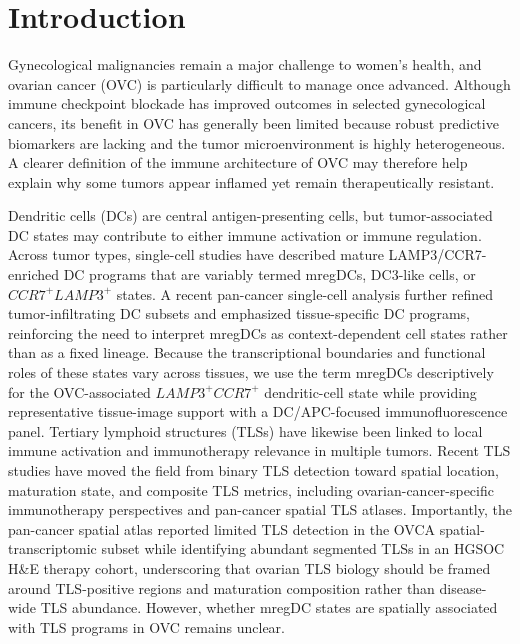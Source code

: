 \documentclass[pdflatex,sn-vancouver-num]{sn-jnl}
\begin{document}

\maketitle


\section{Introduction}

Gynecological malignancies remain a major challenge to women's health, and ovarian cancer (OVC) is particularly difficult to manage once advanced. Although immune checkpoint blockade has improved outcomes in selected gynecological cancers, its benefit in OVC has generally been limited because robust predictive biomarkers are lacking and the tumor microenvironment is highly heterogeneous\cite{bib1,bib3,bib4,bib5,bib6,bib7,bib8}. A clearer definition of the immune architecture of OVC may therefore help explain why some tumors appear inflamed yet remain therapeutically resistant.

Dendritic cells (DCs) are central antigen-presenting cells, but tumor-associated DC states may contribute to either immune activation or immune regulation\cite{bib14,bib15,bib16}. Across tumor types, single-cell studies have described mature LAMP3/CCR7-enriched DC programs that are variably termed mregDCs, DC3-like cells, or $CCR7^{+}LAMP3^{+}$ states\cite{bib17,bib19,bib20}. A recent pan-cancer single-cell analysis further refined tumor-infiltrating DC subsets and emphasized tissue-specific DC programs, reinforcing the need to interpret mregDCs as context-dependent cell states rather than as a fixed lineage\cite{bib123}. Because the transcriptional boundaries and functional roles of these states vary across tissues, we use the term mregDCs descriptively for the OVC-associated $LAMP3^{+}CCR7^{+}$ dendritic-cell state while providing representative tissue-image support with a DC/APC-focused immunofluorescence panel. Tertiary lymphoid structures (TLSs) have likewise been linked to local immune activation and immunotherapy relevance in multiple tumors\cite{bib32,bib33}. Recent TLS studies have moved the field from binary TLS detection toward spatial location, maturation state, and composite TLS metrics, including ovarian-cancer-specific immunotherapy perspectives and pan-cancer spatial TLS atlases\cite{bib118,bib119,bib122}. Importantly, the pan-cancer spatial atlas reported limited TLS detection in the OVCA spatial-transcriptomic subset while identifying abundant segmented TLSs in an HGSOC H\&E therapy cohort, underscoring that ovarian TLS biology should be framed around TLS-positive regions and maturation composition rather than disease-wide TLS abundance\cite{bib118}. However, whether mregDC states are spatially associated with TLS programs in OVC remains unclear.
\end{document}
